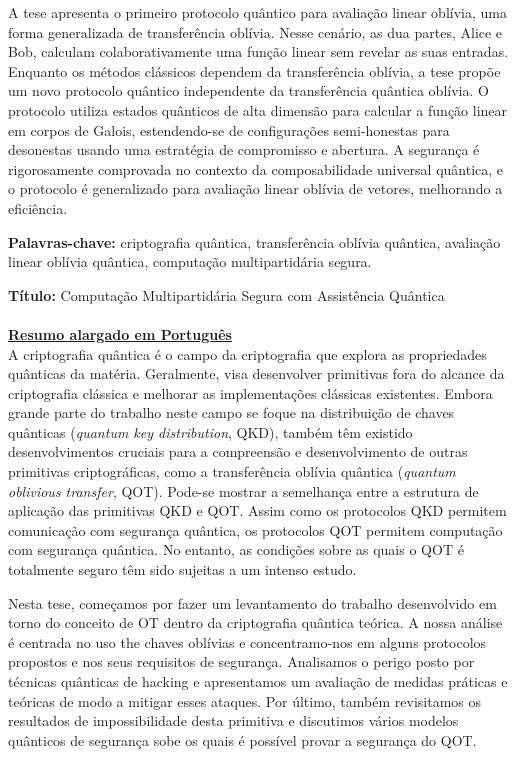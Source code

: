 \documentclass[12pt]{report}
\begin{document}
A tese apresenta o primeiro protocolo quântico para avaliação linear oblívia, uma forma generalizada de transferência oblívia. Nesse cenário, as dua partes, Alice e Bob, calculam colaborativamente uma função linear sem revelar as suas entradas. Enquanto os métodos clássicos dependem da transferência oblívia, a tese propõe um novo protocolo quântico independente da transferência quântica oblívia. O protocolo utiliza estados quânticos de alta dimensão para calcular a função linear em corpos de Galois, estendendo-se de configurações semi-honestas para desonestas usando uma estratégia de compromisso e abertura. A segurança é rigorosamente comprovada no contexto da composabilidade universal quântica, e o protocolo é generalizado para avaliação linear oblívia de vetores, melhorando a eficiência.

\vfill
\begin{flushleft}
\textbf{Palavras-chave:} criptografia qu\^{a}ntica, transferência oblívia quântica, avaliação linear oblívia quântica, computação multipartidária segura.
\end{flushleft}


\newpage


\noindent\textbf{T\'itulo:} Computa\c{c}\~{a}o Multipartid\'{a}ria Segura com Assist\^{e}ncia Qu\^{a}ntica\\\\

\noindent\underline{\textbf{Resumo alargado em Portugu\^{e}s}}\\

A criptografia quântica é o campo da criptografia que explora as propriedades quânticas da matéria. Geralmente, visa desenvolver primitivas fora do alcance da criptografia clássica e melhorar as implementações clássicas existentes. Embora grande parte do trabalho neste campo se foque na distribuição de chaves quânticas (\textit{quantum key distribution}, QKD), também têm existido desenvolvimentos cruciais para a compreensão e desenvolvimento de outras primitivas criptográficas, como a transferência oblívia quântica (\textit{quantum oblivious transfer}, QOT). Pode-se mostrar a semelhança entre a estrutura de aplicação das primitivas QKD e QOT. Assim como os protocolos QKD permitem comunicação com segurança quântica, os protocolos QOT permitem computação com segurança quântica. No entanto, as condições sobre as quais o QOT é totalmente seguro têm sido sujeitas a um intenso estudo. 

Nesta tese, começamos por fazer um levantamento do trabalho desenvolvido em torno do conceito de OT dentro da criptografia quântica teórica. A nossa análise é centrada no uso the chaves oblívias e concentramo-nos em alguns protocolos propostos e nos seus requisitos de segurança. Analisamos o perigo posto por técnicas quânticas de hacking e apresentamos um avaliação de medidas práticas e teóricas de modo a mitigar esses ataques. Por último, também revisitamos os resultados de impossibilidade desta primitiva e discutimos vários modelos quânticos de segurança sobe os quais é possível provar a segurança do QOT.
\end{document}

